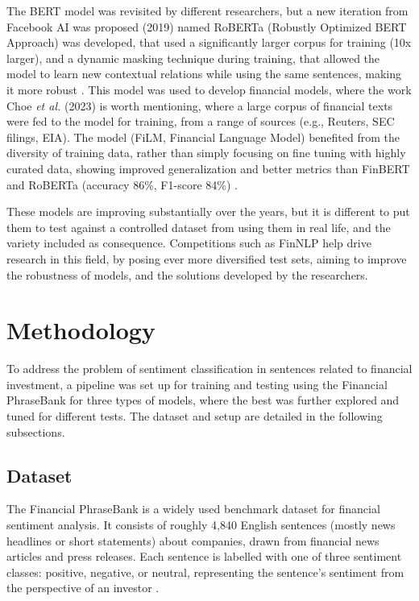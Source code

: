 \documentclass[conference]{IEEEtran}
\begin{document}
The BERT model was revisited by different researchers, but a new iteration from Facebook AI was proposed (2019) named RoBERTa (Robustly Optimized BERT Approach) was developed, that used a significantly larger corpus for training (10x larger), and a dynamic masking technique during training, that allowed the model to learn new contextual relations while using the same sentences, making it more robust \cite{liu2019roberta}. This model was used to develop financial models, where the work Choe \textit{et al.} (2023) is worth mentioning, where a large corpus of financial texts were fed to the model for training, from a range of sources (e.g., Reuters, SEC filings, EIA). The model (FiLM, Financial Language Model) benefited from the diversity of training data, rather than simply focusing on fine tuning with highly curated data, showing improved generalization and better metrics than FinBERT and RoBERTa (accuracy 86\%, F1-score 84\%) \cite{choe2023exploring}.

These models are improving substantially over the years, but it is different to put them to test against a controlled dataset from using them in real life, and the variety included as consequence. Competitions such as FinNLP help drive research in this field, by posing ever more diversified test sets, aiming to improve the robustness of models, and the solutions developed by the researchers.


\section{Methodology}

To address the problem of sentiment classification in sentences related to financial investment, a pipeline was set up for training and testing using the Financial PhraseBank for three types of models, where the best was further explored and tuned for different tests. The dataset and setup are detailed in the following subsections.

\subsection{Dataset}

The Financial PhraseBank is a widely used benchmark dataset for financial sentiment analysis. It consists of roughly 4,840 English sentences (mostly news headlines or short statements) about companies, drawn from financial news articles and press releases. Each sentence is labelled with one of three sentiment classes: positive, negative, or neutral, representing the sentence’s sentiment from the perspective of an investor \cite{dataset, malo2014good}.
\end{document}
